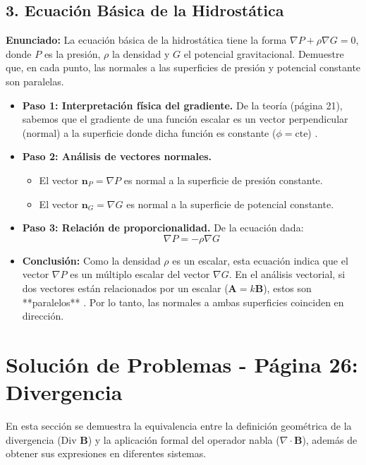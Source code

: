 \documentclass[a4paper]{article}
\begin{document}
\subsection*{3. Ecuación Básica de la Hidrostática}
\textbf{Enunciado:} La ecuación básica de la hidrostática tiene la forma $\nabla P + \rho \nabla G = 0$, donde $P$ es la presión, $\rho$ la densidad y $G$ el potencial gravitacional. Demuestre que, en cada punto, las normales a las superficies de presión y potencial constante son paralelas.

\begin{itemize}
    \item \textbf{Paso 1: Interpretación física del gradiente.} De la teoría (página 21), sabemos que el gradiente de una función escalar es un vector perpendicular (normal) a la superficie donde dicha función es constante ($\phi = \text{cte}$) \cite{80, 84}.
    \item \textbf{Paso 2: Análisis de vectores normales.}
    \begin{itemize}
        \item El vector $\mathbf{n}_P = \nabla P$ es normal a la superficie de presión constante.
        \item El vector $\mathbf{n}_G = \nabla G$ es normal a la superficie de potencial constante.
    \end{itemize}
    \item \textbf{Paso 3: Relación de proporcionalidad.} De la ecuación dada:
    \begin{equation}
        \nabla P = -\rho \nabla G
    \end{equation}
    \item \textbf{Conclusión:} Como la densidad $\rho$ es un escalar, esta ecuación indica que el vector $\nabla P$ es un múltiplo escalar del vector $\nabla G$. En el análisis vectorial, si dos vectores están relacionados por un escalar ($\mathbf{A} = k \mathbf{B}$), estos son **paralelos** \cite{84}. Por lo tanto, las normales a ambas superficies coinciden en dirección.
\end{itemize}


\section*{Solución de Problemas - Página 26: Divergencia}

En esta sección se demuestra la equivalencia entre la definición geométrica de la divergencia ($\text{Div }\mathbf{B}$) y la aplicación formal del operador nabla ($\nabla \cdot \mathbf{B}$), además de obtener sus expresiones en diferentes sistemas.
\end{document}

